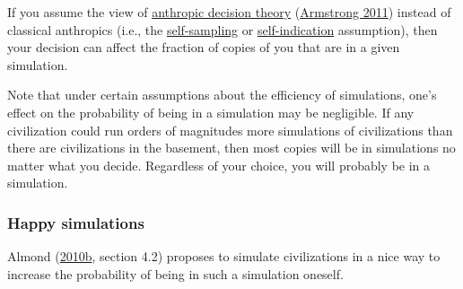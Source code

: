If you assume the view of
\href{https://www.youtube.com/watch?v=aiGOGkBiWEo}{anthropic
decision theory}
(\href{https://arxiv.org/abs/1110.6437}{Armstrong 2011}) instead
of classical anthropics (i.e., the
\href{https://en.wikipedia.org/wiki/Self-sampling_assumption}{self-sampling}
or
\href{https://en.wikipedia.org/wiki/Self-indication_assumption}{self-indication}
assumption), then your decision can affect the fraction of copies of you
that are in a given simulation.

Note that under certain assumptions about the efficiency of simulations,
one's effect on the probability of being in a simulation may be
negligible. If any civilization could run orders of magnitudes more
simulations of civilizations than there are civilizations in the
basement, then most copies will be in simulations no matter what you
decide. Regardless of your choice, you will probably be in a simulation.

\subsubsection{Happy simulations}\label{happy-simulations}

Almond
(\href{https://web.archive.org/web/20120310010225/http://www.paul-almond.com/Correlation2.pdf}{2010b},
section 4.2) proposes to simulate civilizations in a nice way to
increase the probability of being in such a simulation oneself.

